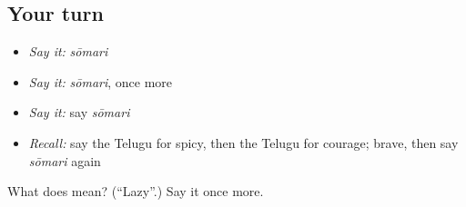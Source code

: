 \subsection*{Your turn}
\begin{itemize}
\raggedright
  \item \emph{Say it:} \emph{sōmari}
  \item \emph{Say it:} \emph{sōmari}, once more
  \item \emph{Say it:} say \emph{sōmari}
  \item \emph{Recall:} say the Telugu for spicy, then the Telugu for courage; brave, then say \emph{sōmari} again
\end{itemize}

\begin{tcolorbox}[breakable,colback=teal!4,colframe=teal!35!black,title={Before you move on}]
What does  mean? (\textquotedblleft{}Lazy\textquotedblright{}.) Say it once more.
\end{tcolorbox}
